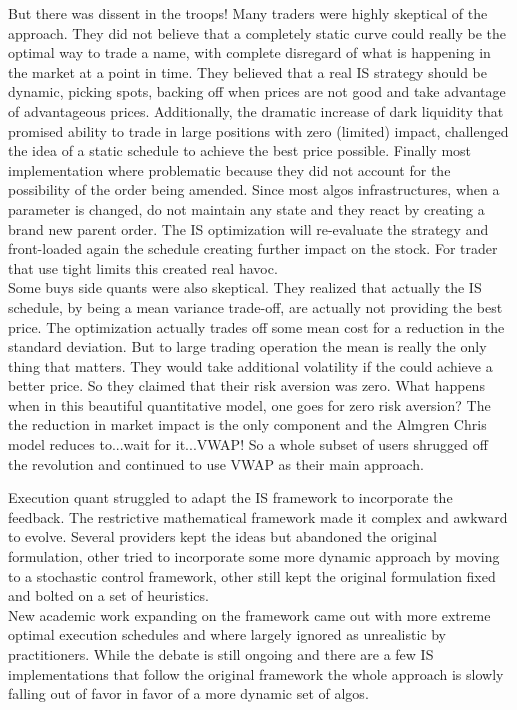 But there was dissent in the troops! Many traders were highly skeptical of the approach. They did not believe that a completely static curve could really be the optimal way to trade a name, with complete disregard of what is happening in the market at a point in time. They believed that a real IS strategy should be dynamic,  picking spots,  backing off when prices are not good and take advantage of advantageous prices.  Additionally, the dramatic increase of dark liquidity that promised ability to trade in large positions with zero (limited) impact, challenged the idea of a static schedule to achieve the best price possible. Finally most implementation where problematic because they did not account for the possibility of the order being amended. Since most algos infrastructures, when a parameter is changed, do not maintain any state and they react by creating a brand new parent order. The IS optimization will re-evaluate the strategy and front-loaded again the schedule creating further impact on the stock. For trader that use tight limits this created real havoc. \\

Some buys side quants were also skeptical. They realized that actually the IS schedule, by being a mean variance trade-off, are actually not providing the best price. The optimization actually trades off some mean cost for a reduction in the standard deviation.  But to large trading operation the mean is really the only thing that matters. They would take additional volatility if the could achieve a better price. So they claimed that their risk aversion was zero. What happens when in this beautiful quantitative model, one goes for zero risk aversion? The the reduction in market impact is the only component and the Almgren Chris model reduces to...wait for it...VWAP! So a whole subset of users shrugged off the revolution and continued to use VWAP as their main approach.

Execution quant struggled to adapt the IS framework to incorporate the feedback. The restrictive mathematical framework made it complex and awkward to evolve. Several providers kept the ideas but abandoned the original formulation, other tried to incorporate some more dynamic approach by moving to a stochastic control framework, other still kept the original formulation fixed and bolted on a set of heuristics.\\

New academic work expanding on the framework came out with more extreme optimal execution schedules and where largely ignored as unrealistic by practitioners. While the debate is still ongoing and there are a few IS implementations that follow the original framework the whole approach is slowly falling out of favor in favor of a more dynamic set of algos. 

